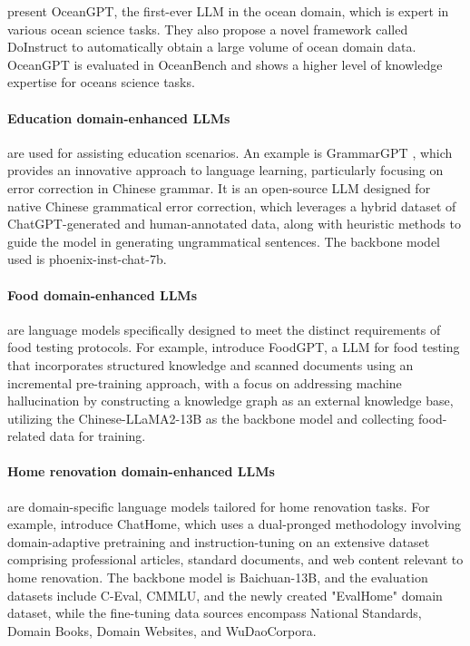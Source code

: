 \citet{bi2023oceangpt} present OceanGPT, the first-ever LLM in the ocean domain, which is expert in various ocean science tasks. They also propose  a novel framework called DoInstruct to automatically obtain a large volume of ocean domain data.  OceanGPT is evaluated in OceanBench and  shows a higher level of knowledge expertise for oceans science tasks.

\paragraph{Education domain-enhanced LLMs} are used for assisting education scenarios. An example is GrammarGPT \citep{fan2023grammargpt}, which provides an innovative approach to language learning, particularly focusing on error correction in Chinese grammar. It is an open-source LLM designed for native Chinese grammatical error correction, which leverages a hybrid dataset of ChatGPT-generated and human-annotated data, along with heuristic methods to guide the model in generating ungrammatical sentences. The backbone model used is phoenix-inst-chat-7b.

\paragraph{Food domain-enhanced LLMs} are language models specifically designed to meet the distinct requirements of food testing protocols. For example, \citet{qi2023foodgpt} introduce FoodGPT, a LLM for food testing that incorporates structured knowledge and scanned documents using an incremental pre-training approach, with a focus on addressing machine hallucination by constructing a knowledge graph as an external knowledge base, utilizing the Chinese-LLaMA2-13B as the backbone model and collecting food-related data for training.


\paragraph{Home renovation domain-enhanced LLMs} are domain-specific language models tailored for home renovation tasks. For example, 
 \citet{wen2023chathome} introduce ChatHome, which uses a dual-pronged methodology involving domain-adaptive pretraining and instruction-tuning on an extensive dataset comprising professional articles, standard documents, and web content relevant to home renovation. The backbone model is Baichuan-13B, and the evaluation datasets include C-Eval, CMMLU, and the newly created "EvalHome" domain dataset, while the fine-tuning data sources encompass National Standards, Domain Books, Domain Websites, and WuDaoCorpora.

